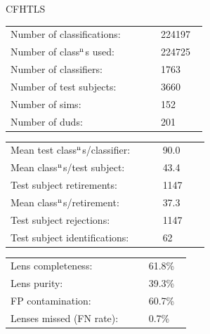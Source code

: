 \documentclass[letterpaper,12pt]{article}
\begin{document}
\begin{minipage}{0.42\linewidth}
{\LARGE CFHTLS}\newline
\medskip

\begin{tabular}{|p{0.65\linewidth}p{0.2\linewidth}|}
\hline
Number of classifications:         & 224197   \\ 
Number of class$^{\rm n}$s used:  & 224725   \\ 
Number of classifiers:             & 1763   \\ 
Number of test subjects:           & 3660   \\ 
Number of sims:                    & 152   \\ 
Number of duds:                    & 201   \\ 
\hline
\end{tabular}
\begin{tabular}{|p{0.65\linewidth}p{0.2\linewidth}|}
\hline
Mean test class$^{\rm n}$s/classifier: & 90.0 \\ 
Mean class$^{\rm n}$s/test subject:    & 43.4 \\ 
Test subject retirements:               & 1147   \\ 
Mean class$^{\rm n}$s/retirement:      & 37.3 \\ 
Test subject rejections:                & 1147   \\ 
Test subject identifications:           & 62   \\ 
\hline
\end{tabular}
\begin{tabular}{|p{0.65\linewidth}p{0.2\linewidth}|}
\hline
Lens completeness:         & 61.8\% \\ 
Lens purity:               & 39.3\% \\ 
FP contamination:          & 60.7\% \\ 
Lenses missed (FN rate):   & 0.7\% \\ 
\hline
\end{tabular}
\end{minipage}\hfill
\end{document}
